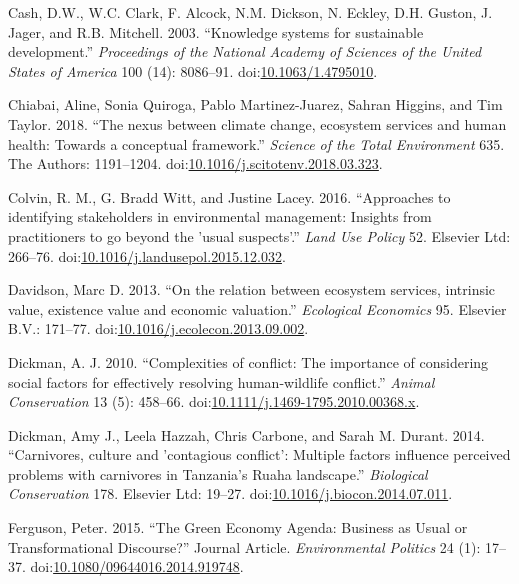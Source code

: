 \documentclass[fleqn,10pt]{wlpeerj} %
\begin{document}
\hypertarget{ref-Cash2003}{}
Cash, D.W., W.C. Clark, F. Alcock, N.M. Dickson, N. Eckley, D.H. Guston,
J. Jager, and R.B. Mitchell. 2003. ``Knowledge systems for sustainable
development.'' \emph{Proceedings of the National Academy of Sciences of
the United States of America} 100 (14): 8086--91.
doi:\href{https://doi.org/10.1063/1.4795010}{10.1063/1.4795010}.

\hypertarget{ref-Chiabai2018}{}
Chiabai, Aline, Sonia Quiroga, Pablo Martinez-Juarez, Sahran Higgins,
and Tim Taylor. 2018. ``The nexus between climate change, ecosystem
services and human health: Towards a conceptual framework.''
\emph{Science of the Total Environment} 635. The Authors: 1191--1204.
doi:\href{https://doi.org/10.1016/j.scitotenv.2018.03.323}{10.1016/j.scitotenv.2018.03.323}.

\hypertarget{ref-Colvin2016}{}
Colvin, R. M., G. Bradd Witt, and Justine Lacey. 2016. ``Approaches to
identifying stakeholders in environmental management: Insights from
practitioners to go beyond the 'usual suspects'.'' \emph{Land Use
Policy} 52. Elsevier Ltd: 266--76.
doi:\href{https://doi.org/10.1016/j.landusepol.2015.12.032}{10.1016/j.landusepol.2015.12.032}.

\hypertarget{ref-Davidson2013}{}
Davidson, Marc D. 2013. ``On the relation between ecosystem services,
intrinsic value, existence value and economic valuation.''
\emph{Ecological Economics} 95. Elsevier B.V.: 171--77.
doi:\href{https://doi.org/10.1016/j.ecolecon.2013.09.002}{10.1016/j.ecolecon.2013.09.002}.

\hypertarget{ref-Dickman2010}{}
Dickman, A. J. 2010. ``Complexities of conflict: The importance of
considering social factors for effectively resolving human-wildlife
conflict.'' \emph{Animal Conservation} 13 (5): 458--66.
doi:\href{https://doi.org/10.1111/j.1469-1795.2010.00368.x}{10.1111/j.1469-1795.2010.00368.x}.

\hypertarget{ref-Dickman2014}{}
Dickman, Amy J., Leela Hazzah, Chris Carbone, and Sarah M. Durant. 2014.
``Carnivores, culture and 'contagious conflict': Multiple factors
influence perceived problems with carnivores in Tanzania's Ruaha
landscape.'' \emph{Biological Conservation} 178. Elsevier Ltd: 19--27.
doi:\href{https://doi.org/10.1016/j.biocon.2014.07.011}{10.1016/j.biocon.2014.07.011}.

\hypertarget{ref-Ferguson2015}{}
Ferguson, Peter. 2015. ``The Green Economy Agenda: Business as Usual or
Transformational Discourse?'' Journal Article. \emph{Environmental
Politics} 24 (1): 17--37.
doi:\href{https://doi.org/10.1080/09644016.2014.919748}{10.1080/09644016.2014.919748}.
\end{document}
